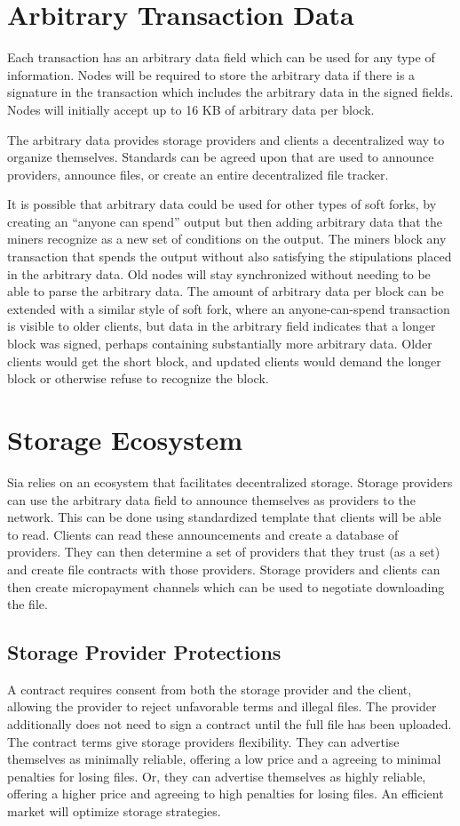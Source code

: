 \documentclass[twocolumn]{article}
\begin{document}
\section{Arbitrary Transaction Data}
Each transaction has an arbitrary data field which can be used for any type of information.
Nodes will be required to store the arbitrary data if there is a signature in the transaction which includes the arbitrary data in the signed fields.
Nodes will initially accept up to 16 KB of arbitrary data per block.

The arbitrary data provides storage providers and clients a decentralized way to organize themselves.
Standards can be agreed upon that are used to announce providers, announce files, or create an entire decentralized file tracker.

It is possible that arbitrary data could be used for other types of soft forks, by creating an ``anyone can spend'' output but then adding arbitrary data that the miners recognize as a new set of conditions on the output.
The miners block any transaction that spends the output without also satisfying the stipulations placed in the arbitrary data.
Old nodes will stay synchronized without needing to be able to parse the arbitrary data.
The amount of arbitrary data per block can be extended with a similar style of soft fork, where an anyone-can-spend transaction is visible to older clients, but data in the arbitrary field indicates that a longer block was signed, perhaps containing substantially more arbitrary data.
Older clients would get the short block, and updated clients would demand the longer block or otherwise refuse to recognize the block.

\section{Storage Ecosystem}
Sia relies on an ecosystem that facilitates decentralized storage.
Storage providers can use the arbitrary data field to announce themselves as providers to the network.
This can be done using standardized template that clients will be able to read.
Clients can read these announcements and create a database of providers.
They can then determine a set of providers that they trust (as a set) and create file contracts with those providers.
Storage providers and clients can then create micropayment channels \cite{mpc} which can be used to negotiate downloading the file.

\subsection{Storage Provider Protections}
A contract requires consent from both the storage provider and the client, allowing the provider to reject unfavorable terms and illegal files.
The provider additionally does not need to sign a contract until the full file has been uploaded.
The contract terms give storage providers flexibility.
They can advertise themselves as minimally reliable, offering a low price and a agreeing to minimal penalties for losing files.
Or, they can advertise themselves as highly reliable, offering a higher price and agreeing to high penalties for losing files.
An efficient market will optimize storage strategies.
\end{document}
